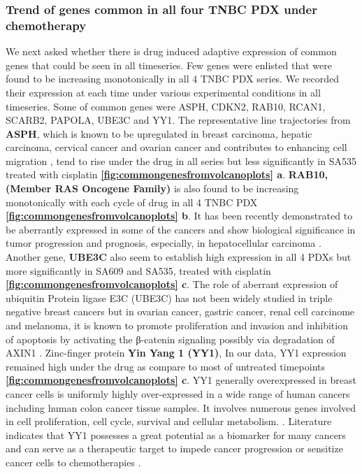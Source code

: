 \subsubsection{Trend of genes common in all four TNBC PDX under chemotherapy}
We next asked whether there is drug induced adaptive expression of common genes that could be seen in all timeseries. 
 Few genes were enlisted that were found to be increasing monotonically in all 4 TNBC PDX series. We recorded their expression at each time under various experimental conditions in all timeseries. Some of common genes were ASPH, CDKN2, RAB10, RCAN1, SCARB2, PAPOLA, UBE3C and YY1. The representative line trajectories from \textbf{ASPH}, which is known to be upregulated in breast carcinoma, hepatic carcinoma, cervical cancer and ovarian cancer and contributes to enhancing cell migration  \cite{zheng2020diverse,li2018expression, hou2018recent, lin2019asph}, tend to rise under the drug in all series but less significantly in SA535 treated with cisplatin \textbf{\autoref{fig:commongenesfromvolcanoplots} a}. 
\textbf{RAB10,(Member RAS Oncogene Family)} is also found to be increasing monotonically with each cycle of drug in all 4 TNBC PDX \textbf{\autoref{fig:commongenesfromvolcanoplots} b}. It has been recently demonstrated to be aberrantly expressed in some of the cancers and show biological significance in tumor progression and prognosis,  especially, in hepatocellular carcinoma \cite{wang2017rab10, he2002identification, jiang2016mir}. 
Another gene, \textbf{UBE3C} also seem to establish high expression in all 4 PDXs but more significantly in SA609 and SA535, treated with cisplatin \textbf{\autoref{fig:commongenesfromvolcanoplots} c}. The role of aberrant expression of ubiquitin Protein ligase E3C (UBE3C) has not been widely studied in triple negative breast cancers but in ovarian cancer, gastric cancer, renal cell carcinome and melanoma, it is known to promote proliferation and invasion and inhibition of apoptosis by activating the β-catenin signaling possibly via degradation of AXIN1 \cite{xiong2019mir, pan2015ubiquitin, zhang2020ube3c}.
 Zinc-finger protein \textbf{Yin Yang 1 (YY1)}, In our data, YY1 expression remained high under the drug as compare to most of untreated timepoints \textbf{\autoref{fig:commongenesfromvolcanoplots} c}. YY1 generally overexpressed in breast cancer cells 
is uniformly highly over-expressed in a wide range of human cancers including human colon cancer tissue samples. It involves numerous genes involved in cell proliferation, cell cycle, survival and cellular metabolism.  \cite{wan2012yin, chinnappan2009transcription, meliala2020biological}. Literature indicates that YY1 possesses a great potential as a biomarker for many cancers and can serve as a therapeutic target to impede cancer progression or sensitize cancer cells to chemotherapies \cite{wan2012yin, chinnappan2009transcription, meliala2020biological, shi2015role}.

